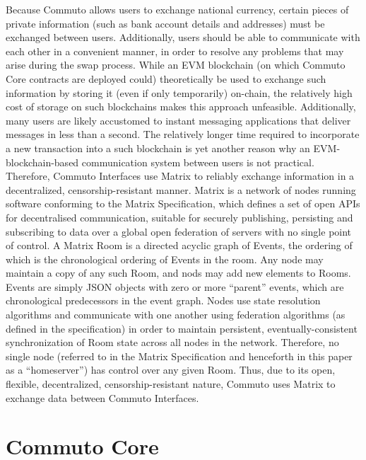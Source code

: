 \documentclass[11pt]{article}
\begin{document}
    Because Commuto allows users to exchange national currency, certain pieces of private
    information (such as bank account details and addresses) must be exchanged between users.
    Additionally, users should be able to communicate with each other in a convenient manner, in
    order to resolve any problems that may arise during the swap process.
    While an EVM blockchain (on which Commuto Core contracts are deployed could) theoretically
    be used to exchange such information by storing it (even if only temporarily) on-chain, the
    relatively high cost of storage on such blockchains makes this approach unfeasible.
    Additionally, many users are likely accustomed to instant messaging applications that
    deliver messages in less than a second.
    The relatively longer time required to incorporate a new transaction into a such blockchain is
    yet another reason why an EVM-blockchain-based communication system between users is not
    practical.
    Therefore, Commuto Interfaces use Matrix\cite{Matrix} to reliably exchange information in a
    decentralized, censorship-resistant manner.
    Matrix is a network of nodes running software conforming to the Matrix
    Specification\cite{MatrixSpec}, which defines a set of open APIs for decentralised
    communication, suitable for securely publishing, persisting and subscribing to data over a
    global open federation of servers with no single point of control.
    A Matrix Room is a directed acyclic graph of Events, the ordering of which is the chronological
    ordering of Events in the room.
    Any node may maintain a copy of any such Room, and nods may add new elements to Rooms.
    Events are simply JSON objects with zero or more ``parent'' events, which are chronological
    predecessors in the event graph.
    Nodes use state resolution algorithms and communicate with one another using federation
    algorithms (as defined in the specification) in order to maintain persistent,
    eventually-consistent synchronization of Room state across all nodes in the network.
    Therefore, no single node (referred to in the Matrix Specification and henceforth in this paper
    as a ``homeserver'') has control over any given Room.
    Thus, due to its open, flexible, decentralized, censorship-resistant nature, Commuto uses Matrix
    to exchange data between Commuto Interfaces.

    \section*{Commuto Core}
\end{document}
